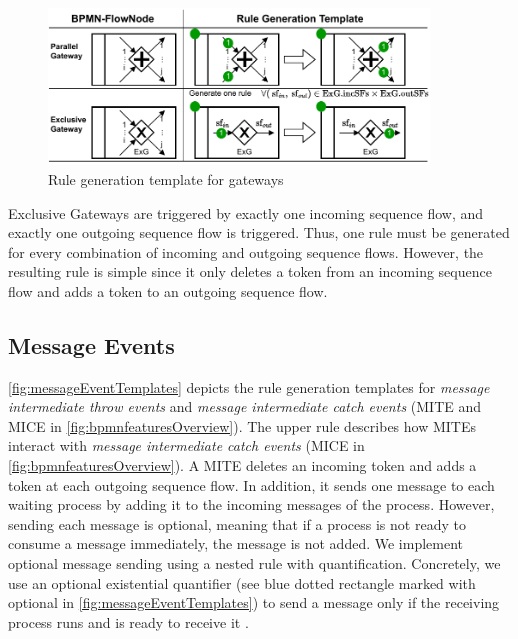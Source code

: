 \documentclass[runningheads]{llncs}
\begin{document}
\begin{figure}[ht]
    \centering
    \includegraphics[width=0.9\textwidth]{images/gateways_template.pdf}
    \caption{Rule generation template for gateways}
    \label{fig:gatewayTemplates}
\end{figure}

Exclusive Gateways are triggered by exactly one incoming sequence flow, and exactly one outgoing sequence flow is triggered.
Thus, one rule must be generated for every combination of incoming and outgoing sequence flows.
However, the resulting rule is simple since it only deletes a token from an incoming sequence flow and adds a token to an outgoing sequence flow.

\subsection{Message Events}
\autoref{fig:messageEventTemplates} depicts the rule generation templates for \textit{message intermediate throw events} and \textit{message intermediate catch events} (\textsf{MITE} and \textsf{MICE} in \autoref{fig:bpmnfeaturesOverview}).
The upper rule describes how MITEs interact with \textit{message intermediate catch events} (\textsf{MICE} in \autoref{fig:bpmnfeaturesOverview}).
A MITE deletes an incoming token and adds a token at each outgoing sequence flow.
In addition, it sends one message to each waiting process by adding it to the incoming messages of the process.
However, sending each message is optional, meaning that if a process is not ready to consume a message immediately, the message is not added.
We implement optional message sending using a nested rule with quantification.
Concretely, we use an optional existential quantifier (see blue dotted rectangle marked with optional in \autoref{fig:messageEventTemplates}) to send a message only if the receiving process runs and is ready to receive it \cite{rensinkNestedQuantificationGraph2006}.
\end{document}
